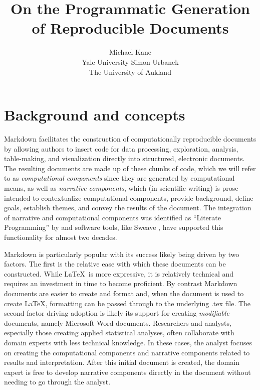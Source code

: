 \documentclass[
]{jss}
\author{
Michael Kane\\Yale University \And Simon Urbanek\\The University of
Aukland
}
\title{On the Programmatic Generation of Reproducible Documents}
\begin{document}
\hypertarget{background-and-concepts}{%
\section{Background and concepts}\label{background-and-concepts}}

 Markdown \citep{baumer2014} facilitates the construction of
computationally reproducible documents by allowing authors to insert
 code for data processing, exploration, analysis,
table-making, and visualization directly into structured, electronic
documents. The resulting documents are made up of these chunks of
 code, which we will refer to as \emph{computational
components} since they are generated by computational means, as well as
\emph{narrative components}, which (in scientific writing) is prose
intended to contextualize computational components, provide background,
define goals, establish themes, and convey the results of the document.
The integration of narrative and computational components was identified
as ``Literate Programming'' by \citet{knuth1984} and software tools,
like Sweave \citep{leisch2002}, have supported this functionality for
almost two decades.

 Markdown is particularly popular with its success likely
being driven by two factors. The first is the relative ease with which
these documents can be constructed. While \LaTeX ~is more expressive, it
is relatively technical and requires an investment in time to become
proficient. By contrast  Markdown documents are easier to
create and format and, when the document is used to create \LaTeX,
formatting can be passed through to the underlying .tex file. The second
factor driving adoption is likely its support for creating
\emph{modifiable} documents, namely Microsoft Word documents.
Researchers and analysts, especially those creating applied statistical
analyses, often collaborate with domain experts with less technical
knowledge. In these cases, the analyst focuses on creating the
computational components and narrative components related to results and
interpretation. After this initial document is created, the domain
expert is free to develop narrative components directly in the document
without needing to go through the analyst.
\end{document}
